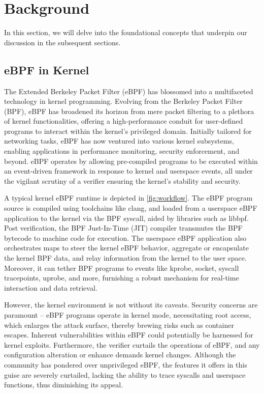 \section{Background}

In this section, we will delve into the foundational concepts that underpin our discussion in the subsequent sections.

\subsection{eBPF in Kernel}

The Extended Berkeley Packet Filter (eBPF) has blossomed into a multifaceted technology in kernel programming. Evolving from the Berkeley Packet Filter (BPF), eBPF has broadened its horizon from mere packet filtering to a plethora of kernel functionalities, offering a high-performance conduit for user-defined programs to interact within the kernel's privileged domain. Initially tailored for networking tasks, eBPF has now ventured into various kernel subsystems, enabling applications in performance monitoring, security enforcement, and beyond. eBPF operates by allowing pre-compiled programs to be executed within an event-driven framework in response to kernel and userspace events, all under the vigilant scrutiny of a verifier ensuring the kernel's stability and security.

A typical kernel eBPF runtime is depicted in \cref{fig:workflow}. The eBPF program source is compiled using toolchains like clang, and loaded from a userspace eBPF application to the kernel via the BPF syscall, aided by libraries such as libbpf. Post verification, the BPF Just-In-Time (JIT) compiler transmutes the BPF bytecode to machine code for execution. The userspace eBPF application also orchestrates maps to steer the kernel eBPF behavior, aggregate or encapsulate the kernel BPF data, and relay information from the kernel to the user space. Moreover, it can tether BPF programs to events like kprobe, socket, syscall tracepoints, uprobe, and more, furnishing a robust mechanism for real-time interaction and data retrieval.

However, the kernel environment is not without its caveats. Security concerns are paramount -- eBPF programs operate in kernel mode, necessitating root access, which enlarges the attack surface, thereby brewing risks such as container escapes. Inherent vulnerabilities within eBPF could potentially be harnessed for kernel exploits. Furthermore, the verifier curtails the operations of eBPF, and any configuration alteration or enhance demands kernel changes\cite{Zhong22}. Although the community has pondered over unprivileged eBPF, the features it offers in this guise are severely curtailed, lacking the ability to trace syscalls and userspace functions, thus diminishing its appeal.

